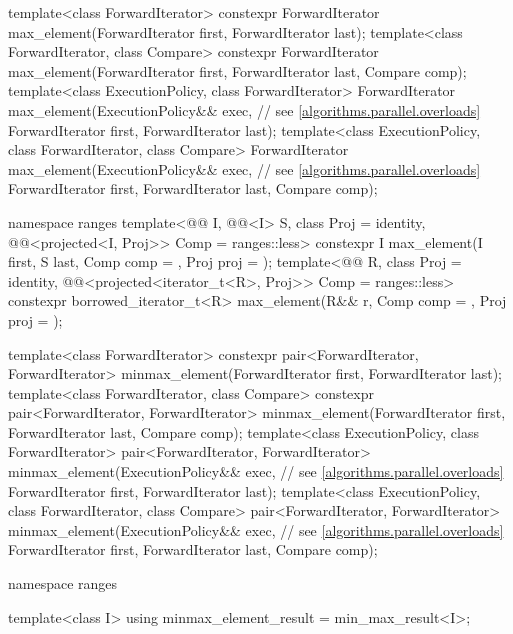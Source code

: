 \begin{codeblock}
{  template<class ForwardIterator>
    constexpr ForwardIterator max_element(ForwardIterator first, ForwardIterator last);
  template<class ForwardIterator, class Compare>
    constexpr ForwardIterator max_element(ForwardIterator first, ForwardIterator last,
                                          Compare comp);
  template<class ExecutionPolicy, class ForwardIterator>
    ForwardIterator max_element(ExecutionPolicy&& exec,         // see \ref{algorithms.parallel.overloads}
                                ForwardIterator first, ForwardIterator last);
  template<class ExecutionPolicy, class ForwardIterator, class Compare>
    ForwardIterator max_element(ExecutionPolicy&& exec,         // see \ref{algorithms.parallel.overloads}
                                ForwardIterator first, ForwardIterator last,
                                Compare comp);

 namespace ranges {
    template<@@ I, @@<I> S, class Proj = identity,
             @@<projected<I, Proj>> Comp = ranges::less>
      constexpr I max_element(I first, S last, Comp comp = {}, Proj proj = {});
    template<@@ R, class Proj = identity,
             @@<projected<iterator_t<R>, Proj>> Comp = ranges::less>
      constexpr borrowed_iterator_t<R>
        max_element(R&& r, Comp comp = {}, Proj proj = {});
  }

  template<class ForwardIterator>
    constexpr pair<ForwardIterator, ForwardIterator>
      minmax_element(ForwardIterator first, ForwardIterator last);
  template<class ForwardIterator, class Compare>
    constexpr pair<ForwardIterator, ForwardIterator>
      minmax_element(ForwardIterator first, ForwardIterator last, Compare comp);
  template<class ExecutionPolicy, class ForwardIterator>
    pair<ForwardIterator, ForwardIterator>
      minmax_element(ExecutionPolicy&& exec,                    // see \ref{algorithms.parallel.overloads}
                     ForwardIterator first, ForwardIterator last);
  template<class ExecutionPolicy, class ForwardIterator, class Compare>
    pair<ForwardIterator, ForwardIterator>
      minmax_element(ExecutionPolicy&& exec,                    // see \ref{algorithms.parallel.overloads}
                     ForwardIterator first, ForwardIterator last, Compare comp);

  namespace ranges {
    template<class I>
      using minmax_element_result = min_max_result<I>;

}}
\end{codeblock}
